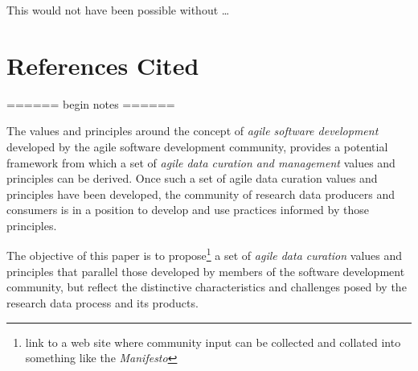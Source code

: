 \documentclass[paper]{ijdc-v9}
\begin{document}
This would not have been possible without \ldots{}

\section{References Cited}\label{references-cited}

====== begin notes ======

The values and principles around the concept of \emph{agile software
development} developed by the agile software development community,
provides a potential framework from which a set of \emph{agile data
curation and management} values and principles can be derived. Once such
a set of agile data curation values and principles have been developed,
the community of research data producers and consumers is in a position
to develop and use practices informed by those principles.

The objective of this paper is to propose\footnote{link to a web site
  where community input can be collected and collated into something
  like the \emph{Manifesto}} a set of \emph{agile data curation} values
and principles that parallel those developed by members of the software
development community, but reflect the distinctive characteristics and
challenges posed by the research data process and its products.
\end{document}
